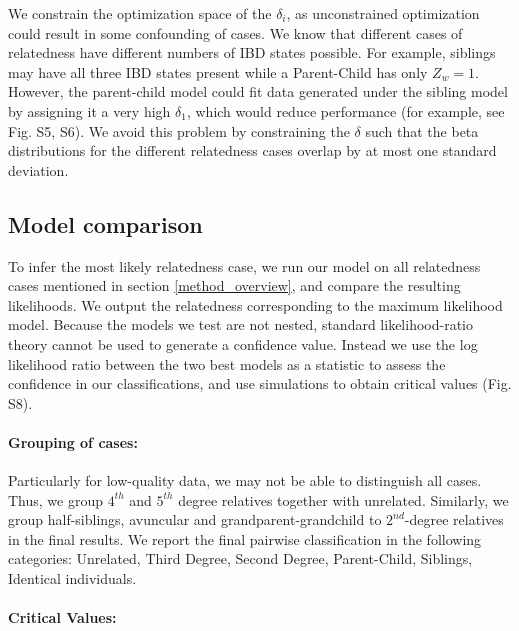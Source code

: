 \documentclass[12pt, letterpaper]{article}
\begin{document}

We constrain the optimization space of the $\delta_i$, as unconstrained optimization could result in some confounding of cases. We know that different cases of relatedness have different numbers of IBD states possible. For example, siblings may have all three IBD states present while a Parent-Child has only $Z_w=1$. However, the parent-child model could fit data generated under the sibling model by assigning it a very high $\delta_1$, which would reduce performance (for example, see Fig. S5, S6). We avoid this problem by constraining the $\delta$ such that the beta distributions for the different relatedness cases overlap by at most one standard deviation.

\subsection{Model comparison}\label{model_comp}
To infer the most likely relatedness case, we run our model on all relatedness cases mentioned in section \ref{method_overview}, and compare the resulting likelihoods. We output the relatedness corresponding to the maximum likelihood model. Because the models we test are not nested, standard likelihood-ratio theory cannot be used to generate a confidence value. Instead we use the log likelihood ratio between the two best models as a statistic to assess the confidence in our classifications, and use simulations to obtain critical values (Fig. S8).

\paragraph{Grouping of cases:}
Particularly for low-quality data, we may not be able to distinguish all cases. Thus, we group $4^{th}$ and $5^{th}$ degree relatives together with unrelated. Similarly, we group  half-siblings, avuncular and grandparent-grandchild to  $2^{nd}$-degree relatives in the final results. We report the final pairwise classification in the following categories: Unrelated, Third Degree, Second Degree, Parent-Child, Siblings, Identical individuals.


\paragraph{Critical Values:}
 
\end{document}

